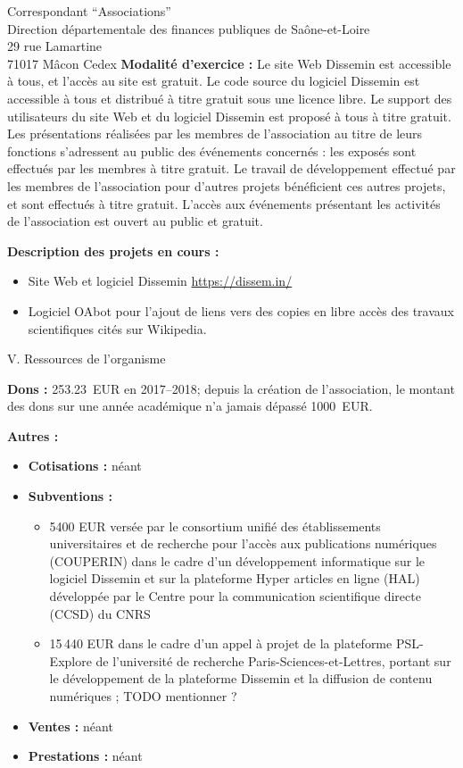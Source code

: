 \documentclass[11pt]{lettre}
\begin{document}
\begin{letter}{Correspondant ``Associations''\\Direction départementale des finances publiques de Saône-et-Loire\\29 rue Lamartine\\71017 Mâcon Cedex}
  \textbf{Modalité d'exercice :} Le site Web Dissemin est accessible à tous, et
  l'accès au site est gratuit. Le code source du logiciel Dissemin est
  accessible à tous et distribué à titre gratuit sous une licence libre. Le
  support des utilisateurs du site Web et du logiciel Dissemin est proposé à
  tous à titre gratuit. Les présentations réalisées par les membres de
  l'association au titre de leurs fonctions s'adressent au public des événements
  concernés : les exposés sont effectués par les membres à titre gratuit. Le
  travail de développement effectué par les membres de l'association pour
  d'autres projets bénéficient ces autres projets, et sont effectués à titre
  gratuit. L'accès aux événements présentant les activités de l'association est
  ouvert au public et gratuit.

  \textbf{Description des projets en cours :}

  \begin{itemize}
    \item Site Web et logiciel Dissemin \url{https://dissem.in/}
    \item Logiciel OAbot pour l'ajout de liens vers des copies en libre accès
      des travaux scientifiques cités sur Wikipedia.
  \end{itemize}

  \bigskip
  {\Large V. Ressources de l'organisme}

  \textbf{Dons :} 253.23~EUR en 2017--2018; depuis la création de l'association,
  le montant des dons sur une année académique n'a jamais dépassé 1000~EUR.

  \textbf{Autres :}

  \begin{itemize}
    \item \textbf{Cotisations :} néant
    \item \textbf{Subventions :}
      \begin{itemize}
        \item 5400 EUR versée par le consortium unifié des
      établissements universitaires et de recherche pour l'accès aux
      publications numériques (COUPERIN) dans le cadre d'un développement
      informatique sur le logiciel Dissemin et sur la plateforme Hyper articles
          en ligne (HAL) développée par le Centre pour la communication
          scientifique directe (CCSD) du CNRS
      \item 15\,440 EUR dans le cadre d'un appel à projet de la plateforme
        PSL-Explore de l'université de recherche Paris-Sciences-et-Lettres,
          portant sur le développement de la plateforme Dissemin et la diffusion
          de contenu numériques ; TODO mentionner ?
      \end{itemize}
    \item \textbf{Ventes :} néant
    \item \textbf{Prestations :} néant
  \end{itemize}


\end{letter}
\end{document}
